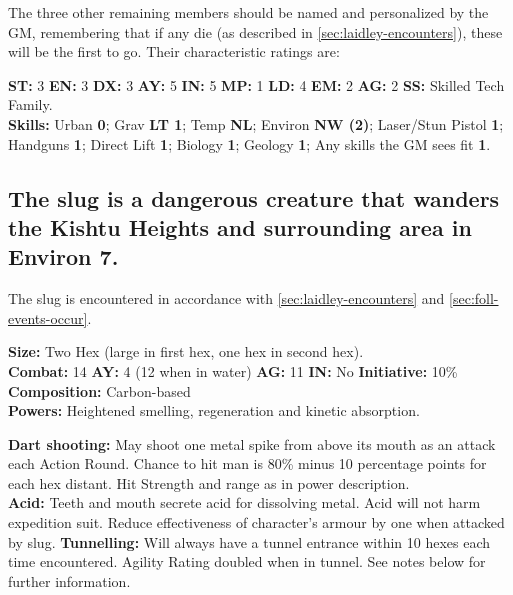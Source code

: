 The three other remaining members should be named and personalized by
the GM, remembering that if any die (as described in
\ref{sec:laidley-encounters}), these will be the first to go. Their
characteristic ratings are:

\textbf{ST:} 3 \textbf{EN:} 3 \textbf{DX:} 3 \textbf{AY:} 5 \textbf{IN:} 5 \textbf{MP:} 1 \textbf{LD:} 4 \textbf{EM:} 2 \textbf{AG:} 2 \textbf{SS:} Skilled Tech Family. \\
\textbf{Skills:} Urban \textbf{0}; Grav \textbf{LT 1}; Temp
\textbf{NL}; Environ \textbf{NW (2)}; Laser/Stun Pistol \textbf{1};
Handguns \textbf{1}; Direct Lift \textbf{1}; Biology \textbf{1};
Geology \textbf{1}; Any skills  
the GM sees fit \textbf{1}. 


\subsection[The Slug]{The slug is a dangerous creature that wanders
  the Kishtu
  Heights and surrounding area in Environ 7.}
\label{sec:slug-dang-creat}

The slug is encountered in accordance with
\ref{sec:laidley-encounters} and \ref{sec:foll-events-occur}.

\textbf{Size:} Two Hex (large in first hex, one hex in second hex). \\
\textbf{Combat:} 14 \textbf{AY:} 4 (12 when in water) \textbf{AG:} 11
\textbf{IN:} No \textbf{Initiative:} 10\% \\ 
\textbf{Composition:} Carbon-based \\
\textbf{Powers:} Heightened smelling, regeneration and kinetic absorption. 

\textbf{Dart shooting:} May shoot one metal spike from above its mouth
as an attack each Action Round. Chance to hit man is 80\% minus 10  
percentage points for each hex distant. Hit Strength and range as in
power description. \\
\textbf{Acid:} Teeth and mouth secrete acid for dissolving metal. Acid
will not harm expedition suit. Reduce effectiveness of character's
armour  
by one when attacked by slug. 
\textbf{Tunnelling:} Will always have a tunnel
entrance within 10 hexes each time encountered. Agility Rating  
doubled when in tunnel. See notes below for further information. 

